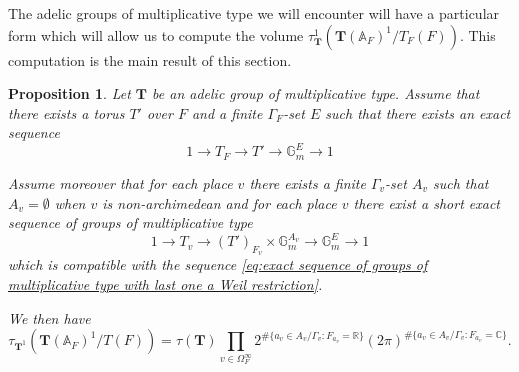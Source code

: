 \documentclass[a4paper,11pt,reqno]{amsart}
\newcommand{\R}{\mathbb{R}}
\newcommand{\C}{\mathbb{C}}
\newcommand{\G}{\mathbb{G}}
\newcommand{\A}{\mathbb{A}}
\newtheorem{proposition}[theorem]{Proposition}
\theoremstyle{definition}
\begin{document}
The adelic groups of multiplicative type we will encounter will have a particular form which will allow us to compute the volume $\tau_{\mathbf{T}}^1(\mathbf{T}(\A_F)^1/T_F(F))$. This computation is the main result of this section.
\begin{proposition}\label{prop:Tamagawa volume of adelic groups of multiplicative type}
	Let $\mathbf{T}$ be an adelic group of multiplicative type. Assume that there exists a torus $T'$ over $F$ and a finite $\Gamma_F$-set $E$ such that there exists an exact sequence 
	\begin{equation}\label{eq:exact sequence of groups of multiplicative type with last one a Weil restriction}
		 1 \to T_F \to T' \to \G_m^E \to 1
	\end{equation}
	
	Assume moreover that for each place $v$ there exists a finite $\Gamma_v$-set $A_v$ such that $A_v = \emptyset$ when $v$ is non-archimedean and for each place $v$ there exist a short exact sequence of groups of multiplicative type
	\[1 \to T_v \to (T')_{F_v} \times \G_m^{A_v} \to \G_m^{E} \to 1\]
	which is compatible with the sequence \eqref{eq:exact sequence of groups of multiplicative type with last one a Weil restriction}.
	
	We then have 
	\[\tau_{\mathbf{T}^1}\left(\mathbf{T}(\A_F)^1/T(F)\right) = \tau(\mathbf{T}) \prod_{v \in \Omega_F^{\infty}} 2^{\# \{a_v \in A_v / \Gamma_v : F_{a_v} = \R\}} (2 \pi)^{\# \{a_v \in A_v / \Gamma_v : F_{a_v} = \C\}}.\]
\end{proposition}
\end{document}
